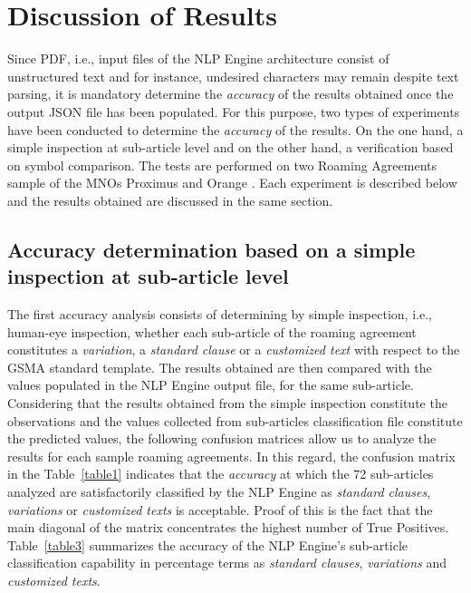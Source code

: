 \section{Discussion of Results}
Since PDF, i.e., input files of the NLP Engine architecture consist of unstructured text and for instance, undesired characters may remain despite text parsing, it is mandatory determine the \textit{accuracy} of the results obtained once the output JSON file has been populated. For this purpose, two types of experiments have been conducted to determine the \textit{accuracy} of the results. On the one hand, a simple inspection at sub-article level and on the other hand, a verification based on symbol comparison. The tests are performed on two Roaming Agreements sample of the MNOs Proximus and Orange \cite{proximus}. Each experiment is described below and the results obtained are discussed in the same section.

\subsection{Accuracy determination based on a simple inspection at sub-article level}
The first accuracy analysis consists of determining by simple inspection, i.e., human-eye inspection, whether each sub-article of the roaming agreement constitutes a \textit{variation}, a \textit{standard clause} or a \textit{customized text} with respect to the GSMA standard template. The results obtained are then compared with the values populated in the NLP Engine output file, for the same sub-article. Considering that the results obtained from the simple inspection constitute the observations and the values collected from sub-articles classification file constitute the predicted values, the following confusion matrices allow us to analyze the results for each sample roaming agreements. In this regard, the confusion matrix in the Table~\ref{table1} indicates that the \textit{accuracy} at which the 72 sub-articles analyzed are satisfactorily classified by the NLP Engine as \textit{standard clauses}, \textit{variations} or \textit{customized texts} is acceptable. Proof of this is the fact that the main diagonal of the matrix concentrates the highest number of True Positives. Table~\ref{table3} summarizes the accuracy of the NLP Engine's sub-article classification capability in percentage terms as \textit{standard clauses}, \textit{variations} and \textit{customized texts}.

